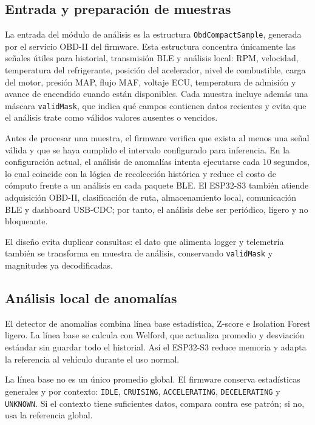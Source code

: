 \documentclass[12pt,letterpaper]{report}
\begin{document}
\subsection{Entrada y preparación de muestras}

La entrada del módulo de análisis es la estructura \texttt{ObdCompactSample}, generada por el servicio OBD-II del firmware. Esta estructura concentra únicamente las señales útiles para historial, transmisión BLE y análisis local: RPM, velocidad, temperatura del refrigerante, posición del acelerador, nivel de combustible, carga del motor, presión MAP, flujo MAF, voltaje ECU, temperatura de admisión y avance de encendido cuando están disponibles. Cada muestra incluye además una máscara \texttt{validMask}, que indica qué campos contienen datos recientes y evita que el análisis trate como válidos valores ausentes o vencidos.

Antes de procesar una muestra, el firmware verifica que exista al menos una señal válida y que se haya cumplido el intervalo configurado para inferencia. En la configuración actual, el análisis de anomalías intenta ejecutarse cada 10 segundos, lo cual coincide con la lógica de recolección histórica y reduce el costo de cómputo frente a un análisis en cada paquete BLE. El ESP32-S3 también atiende adquisición OBD-II, clasificación de ruta, almacenamiento local, comunicación BLE y dashboard USB-CDC; por tanto, el análisis debe ser periódico, ligero y no bloqueante.

El diseño evita duplicar consultas: el dato que alimenta logger y telemetría también se transforma en muestra de análisis, conservando \texttt{validMask} y magnitudes ya decodificadas.

\subsection{Análisis local de anomalías}

El detector de anomalías combina línea base estadística, Z-score e Isolation Forest ligero. La línea base se calcula con Welford, que actualiza promedio y desviación estándar sin guardar todo el historial. Así el ESP32-S3 reduce memoria y adapta la referencia al vehículo durante el uso normal.

La línea base no es un único promedio global. El firmware conserva estadísticas generales y por contexto: \texttt{IDLE}, \texttt{CRUISING}, \texttt{ACCELERATING}, \texttt{DECELERATING} y \texttt{UNKNOWN}. Si el contexto tiene suficientes datos, compara contra ese patrón; si no, usa la referencia global.
\end{document}
